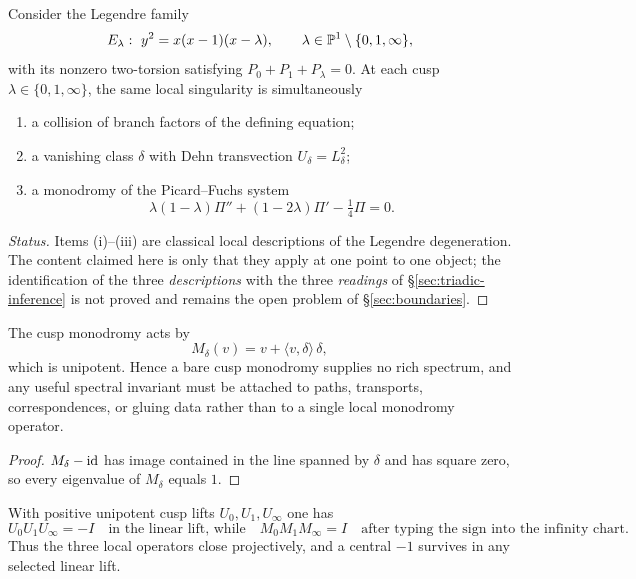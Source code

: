 \begin{proposition}\label{prop:legendre-three-readings}
Consider the Legendre family
\[
  E_\lambda:\ y^{2}=x(x-1)(x-\lambda),\qquad \lambda\in\PP^{1}\setminus\{0,1,\infty\},
\]
with its nonzero two-torsion satisfying $P_0+P_1+P_\lambda=0$.  At each cusp
$\lambda\in\{0,1,\infty\}$, the same local singularity is simultaneously
\begin{enumerate}
\item a collision of branch factors of the defining equation;
\item a vanishing class $\delta$ with Dehn transvection $U_\delta=L_\delta^{2}$;
\item a monodromy of the Picard--Fuchs system
  \[
    \lambda(1-\lambda)\Pi''+(1-2\lambda)\Pi'-\tfrac14\Pi=0 .
  \]
\end{enumerate}
\end{proposition}

\begin{proof}[Status]
Items (i)--(iii) are classical local descriptions of the Legendre degeneration.  The
content claimed here is only that they apply at one point to one object; the
identification of the three \emph{descriptions} with the three \emph{readings} of
\S\ref{sec:triadic-inference} is not proved and remains the open problem of
\S\ref{sec:boundaries}.
\end{proof}

\begin{nogo}\label{nogo:unipotent}
The cusp monodromy acts by
\[
  M_\delta(v)=v+\langle v,\delta\rangle\,\delta ,
\]
which is unipotent.  Hence a bare cusp monodromy supplies no rich spectrum, and any
useful spectral invariant must be attached to paths, transports, correspondences, or
gluing data rather than to a single local monodromy operator.
\end{nogo}

\begin{proof}
$M_\delta-\operatorname{id}$ has image contained in the line spanned by $\delta$ and has square zero,
so every eigenvalue of $M_\delta$ equals $1$.
\end{proof}

\begin{proposition}\label{prop:central-sign-closure}
With positive unipotent cusp lifts $U_0,U_1,U_\infty$ one has
\[
  U_0U_1U_\infty=-I \quad\text{in the linear lift, while}\quad
  M_0M_1M_\infty=I \quad\text{after typing the sign into the infinity chart.}
\]
Thus the three local operators close projectively, and a central $-1$ survives in any
selected linear lift.
\end{proposition}

